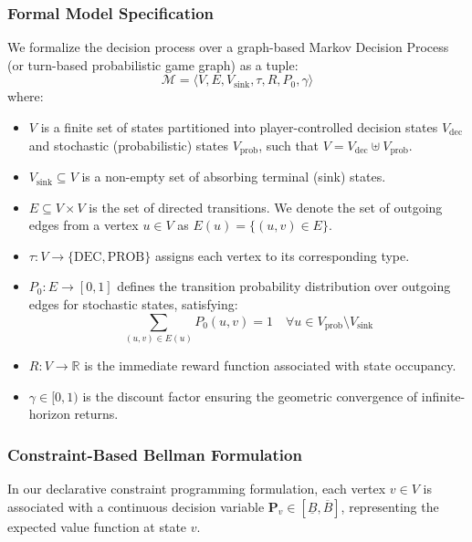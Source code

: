 \documentclass{article}
\begin{document}
\subsubsection{Formal Model Specification}

We formalize the decision process over a graph-based Markov Decision Process (or turn-based probabilistic game graph) as a tuple:
\begin{equation}
\mathcal{M} = \langle V, E, V_{\text{sink}}, \tau, R, P_0, \gamma \rangle
\end{equation}
where:
\begin{itemize}
    \item $V$ is a finite set of states partitioned into player-controlled decision states $V_{\text{dec}}$ and stochastic (probabilistic) states $V_{\text{prob}}$, such that $V = V_{\text{dec}} \uplus V_{\text{prob}}$.
    \item $V_{\text{sink}} \subseteq V$ is a non-empty set of absorbing terminal (sink) states.
    \item $E \subseteq V \times V$ is the set of directed transitions. We denote the set of outgoing edges from a vertex $u \in V$ as $E(u) = \{ (u, v) \in E \}$.
    \item $\tau : V \to \{\text{DEC}, \text{PROB}\}$ assigns each vertex to its corresponding type.
    \item $P_0 : E \to [0, 1]$ defines the transition probability distribution over outgoing edges for stochastic states, satisfying:
    \begin{equation}
    \sum_{(u, v) \in E(u)} P_0(u, v) = 1 \quad \forall u \in V_{\text{prob}} \setminus V_{\text{sink}}
    \end{equation}
    \item $R : V \to \mathbb{R}$ is the immediate reward function associated with state occupancy.
    \item $\gamma \in [0, 1)$ is the discount factor ensuring the geometric convergence of infinite-horizon returns.
\end{itemize}

\subsubsection{Constraint-Based Bellman Formulation}

In our declarative constraint programming formulation, each vertex $v \in V$ is associated with a continuous decision variable $\mathbf{P}_v \in [\underline{B}, \overline{B}]$, representing the expected value function at state $v$. 
\end{document}
